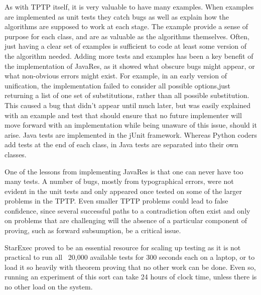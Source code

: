 \documentclass{llncs}
\begin{document}
As with TPTP itself, it is very valuable to have many examples.  When examples are implemented as
unit tests they catch bugs as well as explain how the algorithms are supposed to work at each stage.
The example provide a sense of purpose for each class, and are as valuable as the algorithms
themselves.  Often, just having a clear set of examples is sufficient to code at least some version
of the algorithm needed.  Adding more tests and examples has been a key benefit of the implementation
of JavaRes, as it showed what obscure bugs might appear, or what non-obvious errors might exist.
For example, in an early version of unification, the implementation failed to consider all possible
options,just returning a list of one set of substitutions, rather than all possible substitution.
This caused a bug that didn't appear until much later, but was easily explained with an example and
test that should ensure that no future implementer will move forward with an implementation while
being unaware of this issue, should it arise.  Java tests are implemented in the jUnit framework.
Whereas Python coders add tests at the end of each class, in Java tests  are separated into their
own classes.

One of the lessons from implementing JavaRes is that one can never have too many tests.  A number
of bugs, mostly from typographical errors, were not evident in the unit tests and only appeared
once tested on some of the larger problems in the TPTP.  Even smaller TPTP problems could lead to
false confidence, since several successful paths to a contradiction often exist and only on
problems that are challenging will the absence of a particular component of proving, such as
forward subsumption, be a critical issue.

StarExec proved to be an essential resource for scaling up testing as it is not practical to run
all ~20,000 available tests for 300 seconds each on a laptop, or to load it so heavily with
theorem proving that no other work can be done.  Even so, running an experiment of this sort can
take 24 hours of clock time, unless there is no other load on the system.
\end{document}
